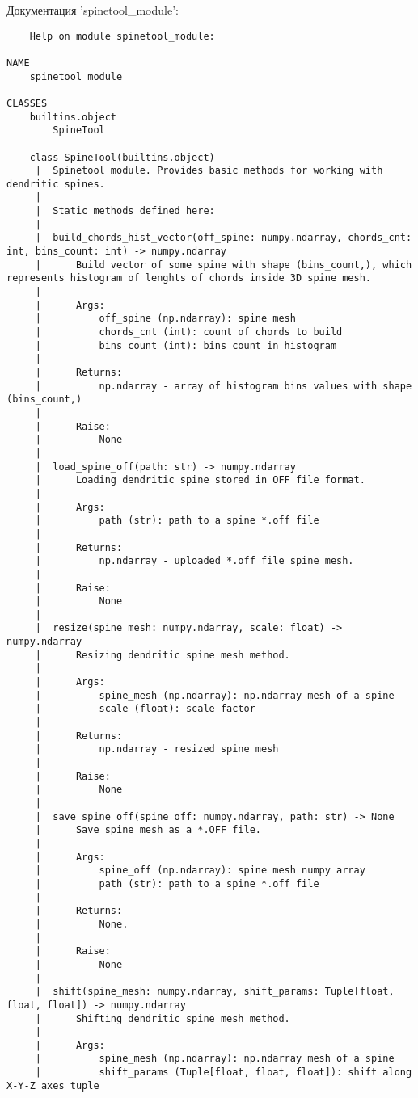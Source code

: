 Документация 'spinetool\_module':
\begin{lstlisting}
	Help on module spinetool_module:

NAME
    spinetool_module

CLASSES
    builtins.object
        SpineTool
    
    class SpineTool(builtins.object)
     |  Spinetool module. Provides basic methods for working with dendritic spines.
     |  
     |  Static methods defined here:
     |  
     |  build_chords_hist_vector(off_spine: numpy.ndarray, chords_cnt: int, bins_count: int) -> numpy.ndarray
     |      Build vector of some spine with shape (bins_count,), which represents histogram of lenghts of chords inside 3D spine mesh.
     |      
     |      Args:
     |          off_spine (np.ndarray): spine mesh
     |          chords_cnt (int): count of chords to build
     |          bins_count (int): bins count in histogram
     |      
     |      Returns:
     |          np.ndarray - array of histogram bins values with shape (bins_count,)
     |      
     |      Raise:
     |          None
     |  
     |  load_spine_off(path: str) -> numpy.ndarray
     |      Loading dendritic spine stored in OFF file format.
     |      
     |      Args:
     |          path (str): path to a spine *.off file
     |      
     |      Returns:
     |          np.ndarray - uploaded *.off file spine mesh.
     |      
     |      Raise:
     |          None
     |  
     |  resize(spine_mesh: numpy.ndarray, scale: float) -> numpy.ndarray
     |      Resizing dendritic spine mesh method.
     |      
     |      Args:
     |          spine_mesh (np.ndarray): np.ndarray mesh of a spine
     |          scale (float): scale factor
     |      
     |      Returns:
     |          np.ndarray - resized spine mesh
     |      
     |      Raise:
     |          None
     |  
     |  save_spine_off(spine_off: numpy.ndarray, path: str) -> None
     |      Save spine mesh as a *.OFF file.
     |      
     |      Args:
     |          spine_off (np.ndarray): spine mesh numpy array
     |          path (str): path to a spine *.off file
     |      
     |      Returns:
     |          None.
     |      
     |      Raise:
     |          None
     |  
     |  shift(spine_mesh: numpy.ndarray, shift_params: Tuple[float, float, float]) -> numpy.ndarray
     |      Shifting dendritic spine mesh method.
     |      
     |      Args:
     |          spine_mesh (np.ndarray): np.ndarray mesh of a spine
     |          shift_params (Tuple[float, float, float]): shift along X-Y-Z axes tuple

\end{lstlisting}
